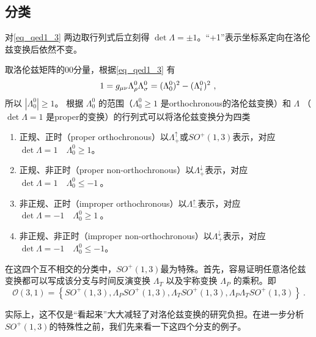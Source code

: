 
\subsection{分类}
对\autoref{eq_qed1_3} 两边取行列式后立刻得 $\det \Lambda=\pm1$。“+1”表示坐标系定向在洛伦兹变换后依然不变。%

取洛伦兹矩阵的00分量，根据\autoref{eq_qed1_3} 有
\begin{equation}
1=g_{\mu \nu} \Lambda_{\rho}^{0} \Lambda_{\sigma}^{0}= (\Lambda_{0}^{0})^2- (\Lambda_{i}^{0})^2~,\\
\end{equation}
所以 $\left|\Lambda_{0}^{0} \right|\geqslant1$。 根据 $\Lambda_{0}^{0}$ 的范围（$\Lambda_{0}^{0}\geqslant1$ 是orthochronous的洛伦兹变换）和 $\Lambda$ （$\det\Lambda=1$ 是proper的变换）的行列式可以将洛伦兹变换分为四类
\begin{enumerate}
\item 正规、正时（proper orthochronous）以$\Lambda_{+}^{\uparrow}$或$SO^+(1,3)$表示，对应 $\det\Lambda=1\quad \Lambda_{0}^{0}\geqslant1$。
\item 正规、非正时（proper non-orthochronous）以$\Lambda_{+}^{\downarrow}$表示，对应 $\det\Lambda=1\quad \Lambda_{0}^{0}\leqslant-1~$。
\item 非正规、正时（improper orthochronous）以$\Lambda_{-}^{\uparrow}$表示，对应 $\det\Lambda=-1 \quad\Lambda_{0}^{0}\geqslant1~$。
\item 非正规、非正时（improper non-orthochronous）以$\Lambda_{+}^{\downarrow}$表示，对应 $\det\Lambda=-1 \quad\Lambda_{0}^{0}\leqslant-1$。
\end{enumerate}

在这四个互不相交的分类中，$SO^+(1,3)$最为特殊。首先，容易证明任意洛伦兹变换都可以写成该分支与时间反演变换 $ \Lambda_{T}$ 以及宇称变换 $\Lambda_{P}$ 的乘积。即
$$\mathcal{O}(3,1)=\left\{SO^+(1,3), \Lambda_{P} SO^+(1,3), \Lambda_{T} SO^+(1,3), \Lambda_{P} \Lambda_{T} SO^+(1,3)\right\}~.
$$

实际上，这不仅是“看起来”大大减轻了对洛伦兹变换的研究负担。在进一步分析$SO^+(1,3)$的特殊性之前，我们先来看一下这四个分支的例子。
